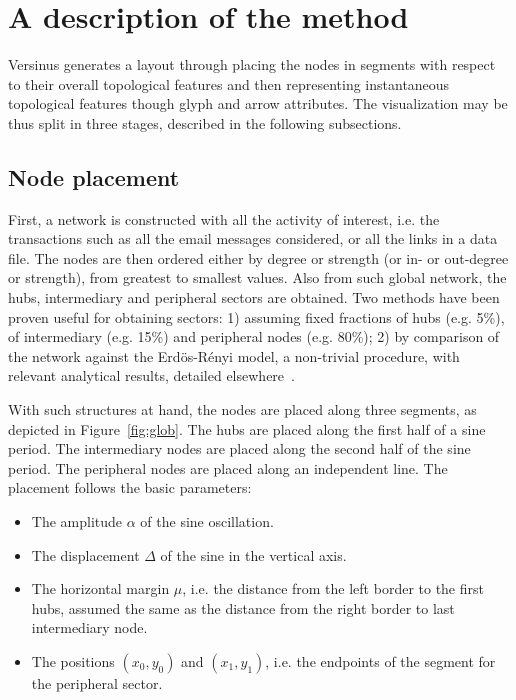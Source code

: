 \documentclass[runningheads]{llncs}
\begin{document}
\section{A description of the method}\label{sec:des}
Versinus generates a layout through placing the nodes in segments
with respect to their overall topological features and then representing
instantaneous topological features though glyph and arrow attributes.
The visualization may be thus split in three stages, described in the following subsections.

\subsection{Node placement}\label{sec:pla}
First, a network is constructed with all the activity of interest, i.e. the transactions such as all the email messages considered, or all the links in a data file.
The nodes are then ordered either by degree or strength (or in- or out-degree or strength), from greatest to smallest values.
Also from such global network, the hubs, intermediary and peripheral sectors are obtained. Two methods have been proven useful for obtaining sectors: 1) assuming fixed fractions of hubs (e.g. 5\%), of intermediary (e.g. 15\%) and peripheral nodes (e.g. 80\%); 2) by comparison of the network against the Erdös-Rényi model, a non-trivial procedure, with relevant analytical results, detailed elsewhere~\cite{stab}.

With such structures at hand, the nodes are placed along three segments, as depicted in Figure~\ref{fig:glob}.
The hubs are placed along the first half of a sine period.
The intermediary nodes are placed along the second half of the sine period.
The peripheral nodes are placed along an independent line.
The placement follows 
the basic parameters:
\begin{itemize}
  \item The amplitude $\alpha$ of the sine oscillation.
  \item The displacement $\Delta$ of the sine in the vertical axis.
  \item The horizontal margin $\mu$, i.e. the distance from the left border to the first hubs, assumed the same as the distance from the right border to last intermediary node.
  \item The positions $(x_0,y_0)$ and $(x_1,y_1)$, i.e. the endpoints of the segment for the peripheral sector.
\end{itemize}
\end{document}
